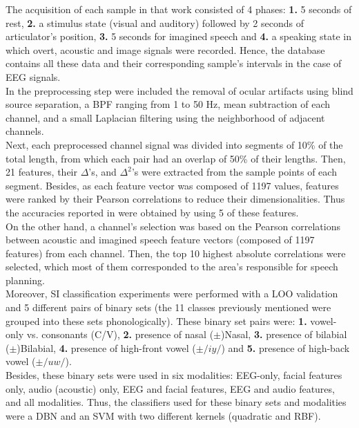 The acquisition of each sample in that work consisted of 4 phases: \textbf{1.} 5 seconds of rest, \textbf{2.} a stimulus state (visual and auditory) followed by 2 seconds of articulator's position, \textbf{3.} 5 seconds for imagined speech and \textbf{4.} a speaking state in which overt, acoustic and image signals were recorded. Hence, the database contains all these data and their corresponding sample's intervals in the case of EEG signals.\\

In the preprocessing step were included the removal of ocular artifacts using blind source separation, a BPF ranging from 1 to 50 Hz, mean subtraction of each channel, and a small Laplacian filtering using the neighborhood of adjacent channels.\\

Next, each preprocessed channel signal was divided into segments of 10\% of the total length, from which each pair had an overlap of 50\% of their lengths. Then, 21 features, their $\Delta$'s, and $\Delta^2$'s were extracted from the sample points of each segment. Besides, as each feature vector was composed of 1197 values, features were ranked by their Pearson correlations to reduce their dimensionalities. Thus the accuracies reported in \cite{zhao2015classifying} were obtained by using 5 of these features.\\

On the other hand, a channel's selection was based on the Pearson correlations between acoustic and imagined speech feature vectors (composed of 1197 features) from each channel. Then, the top 10 highest absolute correlations were selected, which most of them corresponded to the area's responsible for speech planning.\\

Moreover, SI classification experiments were performed with a LOO validation and 5 different pairs of binary sets (the 11 classes previously mentioned were grouped into these sets phonologically). These binary set pairs were: \textbf{1.} vowel-only vs. consonants (C/V), \textbf{2.} presence of nasal ($\pm$)Nasal, \textbf{3.} presence of bilabial ($\pm$)Bilabial, \textbf{4.} presence of high-front vowel ($\pm/iy/$) and \textbf{5.} presence of high-back vowel ($\pm/uw/$).\\

Besides, these binary sets were used in six modalities: EEG-only, facial features only, audio (acoustic) only, EEG and facial features, EEG and audio features, and all modalities. Thus, the classifiers used for these binary sets and modalities were a DBN and an SVM with two different kernels (quadratic and RBF).\\


